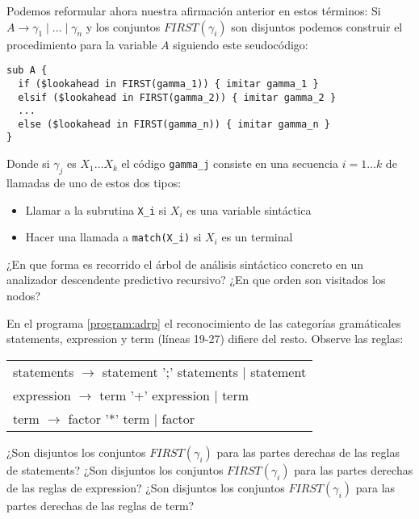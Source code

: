 Podemos reformular ahora nuestra afirmación anterior en estos términos:
Si $A \rightarrow \gamma_1 \mid \ldots \mid \gamma_n$ y los conjuntos $FIRST(\gamma_i)$ son 
disjuntos podemos construir el procedimiento para la variable $A$ siguiendo
este seudocódigo:

\begin{verbatim}
sub A {
  if ($lookahead in FIRST(gamma_1)) { imitar gamma_1 }
  elsif ($lookahead in FIRST(gamma_2)) { imitar gamma_2 }
  ...
  else ($lookahead in FIRST(gamma_n)) { imitar gamma_n }
}
\end{verbatim}

Donde si $\gamma_j$ es $X_1 \ldots X_k$ el código \verb|gamma_j| consiste
en una secuencia $i = 1 \ldots k$ de llamadas de uno de estos dos tipos:
\begin{itemize}
\item
Llamar a la subrutina \verb|X_i| si $X_i$ es una variable sintáctica
\item
Hacer una llamada a \verb|match(X_i)| si $X_i$ es un terminal
\end{itemize}

¿En que forma es recorrido el árbol de análisis sintáctico concreto en un 
analizador descendente predictivo recursivo? ¿En que orden son visitados los nodos?

En el programa \ref{program:adrp} el reconocimiento de las categorías gramáticales
statements, expression y term (líneas 19-27) difiere del resto. Observe las reglas:

\vspace{0.25cm}
\begin{tabular}{l}
statements   $\rightarrow$ statement  ';'  statements        $|$ statement\\
expression   $\rightarrow$ term '+' expression               $|$ term\\
term         $\rightarrow$ factor '*' term                   $|$ factor\\
\end{tabular}
\vspace{0.25cm}

¿Son disjuntos los conjuntos $FIRST(\gamma_i)$ para las partes derechas de las reglas
de statements?
¿Son disjuntos los conjuntos $FIRST(\gamma_i)$ para las partes derechas de las reglas
de expression?
¿Son disjuntos los conjuntos $FIRST(\gamma_i)$ para las partes derechas de las reglas
de term?

